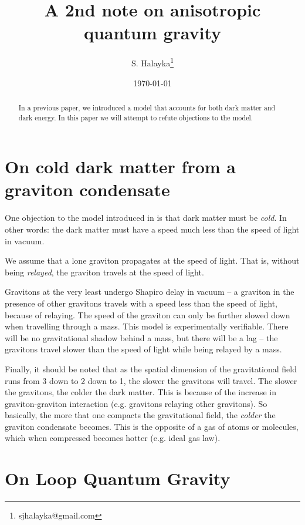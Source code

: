 \documentclass[12pt]{article}
\title{A 2nd note on anisotropic quantum gravity}
\author{S. Halayka\footnote{sjhalayka@gmail.com}}
\date{\today\;\currenttime}
\begin{document}
 
\maketitle

\begin{abstract}
In a previous paper, we introduced a model that accounts for both dark matter and dark energy. In this paper we will attempt to refute objections to the model.
\end{abstract}


\section{On cold dark matter from a graviton condensate}

One objection to the model introduced in \cite{halayka} is that dark matter must be {\textit{cold}}. 
In other words: the dark matter must have a speed much less than the speed of light in vacuum.

We assume that a lone graviton propagates at the speed of light. 
That is, without being {\textit{relayed}}, the graviton travels at the speed of light.

Gravitons at the very least undergo Shapiro delay in vacuum -- a graviton in the presence of other gravitons travels with a speed less than the speed of light, because of relaying.
The speed of the graviton can only be further slowed down when travelling through a mass.
This model is experimentally verifiable. 
There will be no gravitational shadow behind a mass, but there will be a lag -- the gravitons travel slower than the speed of light while being relayed by a mass.

Finally, it should be noted that as the spatial dimension of the gravitational field runs from 3 down to 2 down to 1, the slower the gravitons will travel.
The slower the gravitons, the colder the dark matter.
This is because of the increase in graviton-graviton interaction (e.g. gravitons relaying other gravitons).
So basically, the more that one compacts the gravitational field, the {\textit{colder}} the graviton condensate becomes.
This is the opposite of a gas of atoms or molecules, which when compressed becomes hotter (e.g. ideal gas law).



\section{On Loop Quantum Gravity}
\end{document}
